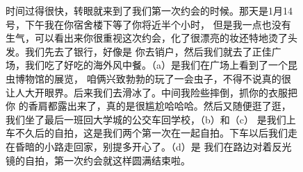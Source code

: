 \documentclass[cn,11pt,chinese]{elegantbook}
\begin{document}
\begin{figure}[h!]
	\caption{时间过得很快，转眼就来到了我们第一次约会的时候。那天是1月14号，下午我在你宿舍楼下等了你将近半个小时，
    但是我一点也没有生气，可以看出来你很重视这次约会，化了很漂亮的妆还特地烫了头发。我们先去了银行，好像是
    你去销户，然后我们就去了正佳广场，我们吃了好吃的海外风中餐。（a）是我们在广场上看到了一个昆虫博物馆的展览，
    咱俩兴致勃勃的玩了一会虫子，不得不说真的很让人大开眼界。后来我们去滑冰了。中间我险些摔倒，抓你的衣服把你
    的香肩都露出来了，真的是很尴尬哈哈哈。然后又随便逛了逛，我们坐了最后一班回大学城的公交车回学校，（b）和（c）
    是我们上车不久后的自拍，这是我们两个第一次在一起自拍。下车以后我们走在昏暗的小路走回家，别提多开心了。（d）是
    我们在路边对着反光镜的自拍，第一次约会就这样圆满结束啦。}
\end{figure}
\end{document}
